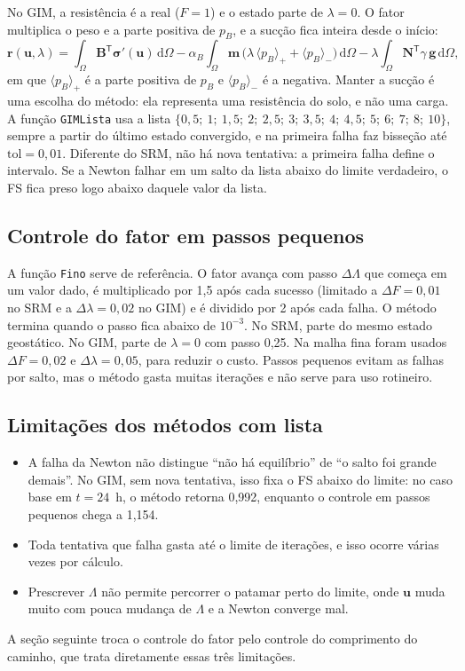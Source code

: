 \documentclass[11pt,a4paper]{article}
\numberwithin{equation}{section}
\begin{document}
No GIM, a resistência é a real ($F = 1$) e o estado parte de $\lambda = 0$. O fator multiplica o peso e a parte positiva de $p_B$, e a sucção fica inteira
desde o início:
\begin{equation}\label{eq:residuo_gim}
\mathbf{r}(\mathbf{u},\lambda) = \int_\Omega \mathbf{B}^{\mathsf T}\boldsymbol\sigma'(\mathbf{u})\,\mathrm{d}\Omega
- \alpha_B\int_\Omega \mathbf{m}\,\big(\lambda\,\langle p_B\rangle_{+} + \langle p_B\rangle_{-}\big)\,\mathrm{d}\Omega
- \lambda\int_\Omega \mathbf{N}^{\mathsf T}\gamma\,\mathbf{g}\,\mathrm{d}\Omega ,
\end{equation}
em que $\langle p_B\rangle_{+}$ é a parte positiva de $p_B$ e $\langle p_B\rangle_{-}$ é a negativa. Manter a sucção é uma escolha do método: ela representa uma resistência do solo, e não
uma carga. A função \texttt{GIMLista} usa a lista $\{0{,}5;\ 1;\ 1{,}5;\ 2;\ 2{,}5;\ 3;\ 3{,}5;\ 4;\ 4{,}5;\ 5;\ 6;\ 7;\ 8;\ 10\}$, sempre a partir do último estado convergido, e na primeira falha
faz bisseção até $\mathrm{tol} = 0{,}01$. Diferente do SRM, não há nova tentativa: a primeira falha define o intervalo. Se a Newton falhar em um salto da lista
abaixo do limite verdadeiro, o FS fica preso logo abaixo daquele valor da lista.

\subsection{Controle do fator em passos pequenos}\label{sec:fino}

A função \texttt{Fino} serve de referência. O fator avança com passo $\Delta\Lambda$ que começa em um valor dado, é multiplicado por 1,5 após cada sucesso (limitado a $\Delta F = 0{,}01$ no SRM e a
$\Delta\lambda = 0{,}02$ no GIM) e é dividido por 2 após cada falha. O método termina quando o passo fica abaixo de $10^{-3}$. No SRM, parte do mesmo estado geostático. No GIM, parte de
$\lambda = 0$ com passo 0,25. Na malha fina foram usados $\Delta F = 0{,}02$ e $\Delta\lambda = 0{,}05$, para reduzir o custo. Passos pequenos evitam as falhas por salto, mas o método gasta muitas iterações e não serve para uso rotineiro.

\subsection{Limitações dos métodos com lista}

\begin{itemize}
\item A falha da Newton não distingue ``não há equilíbrio'' de ``o salto foi grande demais''. No GIM, sem nova tentativa, isso fixa o FS abaixo do limite: no caso base em $t = 24$~h, o método
retorna 0,992, enquanto o controle em passos pequenos chega a 1,154.
\item Toda tentativa que falha gasta até o limite de iterações, e isso ocorre várias vezes por cálculo.
\item Prescrever $\Lambda$ não permite percorrer o patamar perto do limite, onde $\mathbf{u}$ muda muito com pouca mudança de $\Lambda$ e a Newton converge mal.
\end{itemize}
A seção seguinte troca o controle do fator pelo controle do comprimento do caminho, que trata diretamente essas três limitações.
\end{document}
